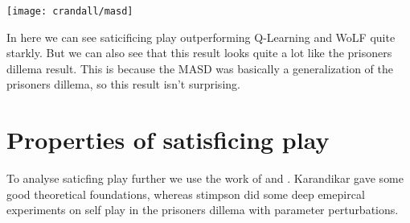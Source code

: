 \texttt{[image: crandall/masd]}

In here we can see saticificing play outperforming Q-Learning and WoLF quite
starkly. But we can also see that this result looks quite a lot like the
prisoners dillema result. This is because the MASD was basically a generalization
of the prisoners dillema, so this result isn't surprising.

\section{Properties of satisficing play}
To analyse saticfing play further we use the work of \citep{karandikar} and
\citep{stimpson:2001}. Karandikar gave some good theoretical foundations,
whereas stimpson did some deep emepircal experiments on self play in the
prisoners dillema with parameter perturbations.
\drafting




\address{Jappie Klooster\\
  Dept. of Informatics\\
  Universiteit Utrecht\\
  The Netherlands\\}


